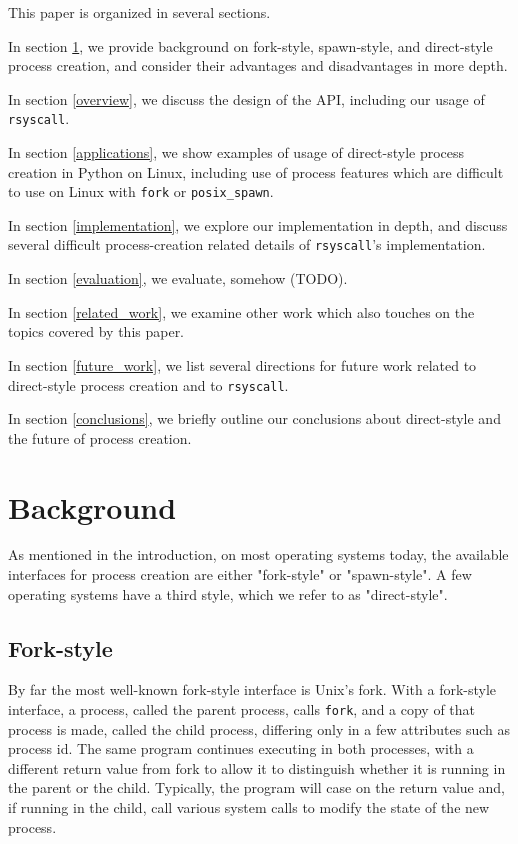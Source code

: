 \documentclass[letterpaper,twocolumn,10pt]{article}
\begin{document}
This paper is organized in several sections.
\begin{compactitem}
\item In section \ref{background}, we provide background on fork-style, spawn-style, and direct-style process creation,
and consider their advantages and disadvantages in more depth.
\item In section \ref{overview}, we discuss the design of the API,
including our usage of \texttt{rsyscall}.
\item In section \ref{applications}, we show examples of usage of direct-style process creation in Python on Linux,
including use of process features which are difficult to use on Linux with \texttt{fork} or \texttt{posix\_spawn}.
\item In section \ref{implementation}, we explore our implementation in depth,
and discuss several difficult process-creation related details of \texttt{rsyscall}'s implementation.
\item In section \ref{evaluation}, we evaluate, somehow (TODO).
\item In section \ref{related_work},
we examine other work which also touches on the topics covered by this paper.
\item In section \ref{future_work},
we list several directions for future work related to direct-style process creation and to \texttt{rsyscall}.
\item In section \ref{conclusions}, we briefly outline our conclusions about direct-style and the future of process creation.
\end{compactitem}
\section{Background}\label{background}
As mentioned in the introduction,
on most operating systems today,
the available interfaces for process creation
are either "fork-style" or "spawn-style".
A few operating systems have a third style, which we refer to as "direct-style".
\subsection{Fork-style}
By far the most well-known fork-style interface is Unix's fork.\cite{forkhist}
With a fork-style interface,
a process, called the parent process, calls \texttt{fork},
and a copy of that process is made,
called the child process,
differing only in a few attributes such as process id.
The same program continues executing in both processes,
with a different return value from fork to allow it to distinguish whether it is running in the parent or the child.
Typically, the program will case on the return value
and, if running in the child,
call various system calls to modify the state of the new process.
\end{document}
